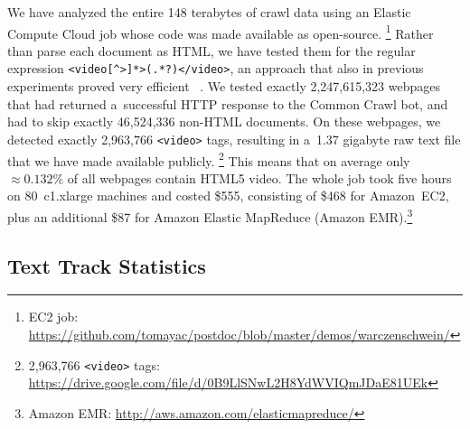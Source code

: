 \documentclass{sig-alternate-ceur}
\newcommand{\inlinelistingsize}{\fontsize{8pt}{11pt}}
\let\oldurl\url
\renewcommand{\url}[1]{\inlinelistingsize\oldurl{#1}}
\begin{document}
We have analyzed the entire 148 terabytes of crawl data
using an Elastic Compute Cloud job
whose code was made available as open-source.%
\footnote{EC2 job:
\url{https://github.com/tomayac/postdoc/blob/master/demos/warczenschwein/}}
Rather than parse each document as HTML,
we have tested them for the regular expression
\texttt{<video[\^{}>]*>(.*?)</video>},
an approach that also in previous experiments
proved very efficient%
~\cite{bizer2013deployment,muhleisen2012web}.
We tested exactly 2,247,615,323 webpages
that had returned a~successful HTTP response to the Common Crawl bot,
and had to skip exactly 46,524,336  non-HTML documents.
On these webpages, we detected exactly
2,963,766 \texttt{<video>} tags,
resulting in a~1.37 gigabyte raw text file
that we have made available publicly.%
\footnote{2,963,766 \texttt{<video>} tags: \url{https://drive.google.com/file/d/0B9LlSNwL2H8YdWVIQmJDaE81UEk}}
This means that on average only ${\approx}0.132\%$ of all webpages contain HTML5 video.
The whole job took five hours on
80~c1.xlarge machines and costed \$555,
consisting of \$468 for Amazon~EC2,
plus an additional \$87 for Amazon Elastic MapReduce
 (Amazon EMR).\footnote{Amazon EMR:
\url{http://aws.amazon.com/elasticmapreduce/}}

\subsection{Text Track Statistics}
\label{sec:text-track-statistics}
\end{document}
